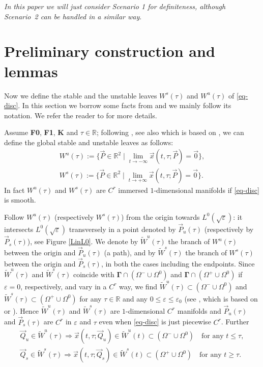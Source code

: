 \documentclass[10pt]{article}
\numberwithin{equation}{section}
\def\ep{\varepsilon}
\def\Om{\Omega}
\def\R{{\mathbb R}}
\def\Q{\vec{Q}}
\def\P{\vec{P}}
\def\x{\vec{x}}
\newcommand{\lit}{{\lim_{t \to +\infty}}}
\newcommand{\lito}{{\lim_{t \to -\infty}}}
\newcommand\bs[1]{{\boldsymbol{#1}}}
\newcommand\assump[1]{{\rm\textbf{#1}}}
\theoremstyle{definition}
\theoremstyle{remark}
\begin{document}
 \emph{In this paper we will just consider Scenario 1 for definiteness,
 although Scenario~2 can be handled in a similar way}.


 \section{Preliminary construction and lemmas}\label{S.prel}

Now we define  the stable and the unstable leaves $W^s(\tau)$ and $W^u(\tau)$ of \eqref{eq-disc}.
 In this section we borrow some facts from \cite{CFPRimut} and we mainly follow its notation.
 We refer the reader to \cite{CFPRimut} for more details.

Assume \assump{F0}, \assump{F1}, \assump{K} and $\tau\in\R$;
following \cite[\S 2]{CFPrestate}, see also\cite[\S 2]{CFPRimut} which is based on \cite[Theorem 2.16]{Jsell},  we can define the global stable and unstable
 leaves as follows:
\begin{equation}\label{mm}
\begin{array}{c}
W^u(\tau) := \{ \P \in \R^2 \mid    \lito \x(t,\tau;\P)=\vec{0} \}, \\
W^s(\tau) := \{ \P \in \R^2 \mid   \lit  \x(t,\tau;\P)=\vec{0} \}.
\end{array}
\end{equation}
In fact  $W^u(\tau)$ and $W^s(\tau)$ are $C^r$ immersed $1$-dimensional manifolds if \eqref{eq-disc} is smooth.


Follow $W^u(\tau)$ (respectively $W^s(\tau)$) from the origin towards
$L^0(\sqrt{\ep})$: it intersects $L^0(\sqrt{\ep})$ transversely in a point denoted by $\P_u(\tau)$
(respectively by $\P_s(\tau)$), see Figure \ref{LinL0}.
We denote by $\tilde{W}^u(\tau)$ the branch of $W^u(\tau)$ between the origin and $\P_u(\tau)$
(a path), and by $\tilde{W}^s(\tau)$ the branch of $W^s(\tau)$ between the origin and $\P_s(\tau)$, in both the cases including the endpoints.
Since $\tilde{W}^u(\tau)$ and $\tilde{W}^s(\tau)$ coincide with $\bs{\Gamma} \cap (\Om^- \cup \Om^0)$
and $\bs{\Gamma} \cap (\Om^+ \cup \Om^0)$ if $\ep=0$, respectively, and vary in a $C^r$ way,
 we find $\tilde{W}^u(\tau)\subset  (\Om^- \cup \Om^0)$ and
$\tilde{W}^s(\tau)\subset  (\Om^+ \cup \Om^0)$ for any $\tau \in \R$ and any $0\le \ep \le \ep_0$ (see  \cite{CFPRimut}, which is based on \cite[Theorem 2.16]{Jsell}
or  \cite[Appendix]{mFaS}). Hence $\tilde{W}^u(\tau)$ and $\tilde{W}^s(\tau)$ are $1$-dimensional $C^r$ manifolds and  $\P_u(\tau)$ and $\P_s(\tau)$
are $C^r$ in $\ep$ and $\tau$ even when \eqref{eq-disc} is just piecewise $C^r$.
Further
\begin{equation}\label{proprieta}
\begin{gathered}
 \Q_u \in \tilde{W}^u(\tau)   \Rightarrow  \x(t,\tau; \Q_u) \in \tilde{W}^u(t) \subset (\Om^- \cup \Om^0) \quad \textrm{for any $t\le
 \tau$},\\
\Q_s \in \tilde{W}^s(\tau) \Rightarrow  \x(t,\tau; \Q_s) \in \tilde{W}^s(t) \subset (\Om^+ \cup \Om^0) \quad \textrm{for any $t\ge \tau$}.
\end{gathered}
\end{equation}
\end{document}
